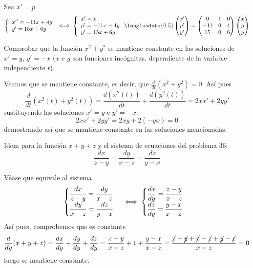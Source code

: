 \begin{sol}
Sea $x'=p$
    $$\left\{ \begin{array}{l}
         x'' = -11x + 4y  \\
         y' = 15x + 6y
    \end{array}\right. \iff \left\{ \begin{array}{l}
         x' = p \\
         p' = -11x+4y\\
         y' = 15x + 6y
    \end{array}\right. \longleadsto{0.5} \begin{pmatrix}
        x' \\ p' \\ y'
    \end{pmatrix}=\begin{pmatrix}
        0 & 1 & 0 \\
        -11 & 0 & 4 \\
        15 & 0 & 6
    \end{pmatrix} \begin{pmatrix}
        x \\ p \\ y 
    \end{pmatrix}$$
\end{sol}
\begin{ejer}
    Comprobar que la función $x^2+y^2$ se mantiene constante en las soluciones de $x'=y$, $y'=-x$ ($x$ e $y$ son funciones incógnitas, dependiente de la variable independiente $t$).
\end{ejer}
\begin{sol}
    Veamos que se mantiene constante, es decir, que $\frac{d}{dt}(x^2+y^2)=0$. Así pues
    $$\dfrac{d}{dt}(x^2(t)+y^2(t))=\dfrac{d(x^2(t))}{dt}+\dfrac{d(y^2(t))}{dt}=2xx'+2yy'$$
    sustituyendo las soluciones $x'=y$ e $y'=-x$:
    $$2xx'+2yy'=2xy+2(-yx)=0$$
    demostrando así que se mantiene constante en las soluciones mencionadas. 
\end{sol}
\begin{ejer}
     Idem para la función $x+y+z$ y el sistema de ecuaciones del problema 36:
     $$\dfrac{dx}{z-y}=\dfrac{dy}{x-z}=\dfrac{dz}{y-x}$$
\end{ejer}
\begin{sol} Véase que equivale al sistema 
    $$\begin{cases} \dfrac{dx}{z-y}=\dfrac{dy}{x-z} \\ \vspace{-5mm} \\ \dfrac{dy}{x-z}=\dfrac{dz}{y-x} \end{cases} \iff \begin{cases} \dfrac{dx}{dy}=\dfrac{z-y}{x-z} \\ \vspace{-5mm} \\ \dfrac{dz}{dy}=\dfrac{y-x}{x-z} \end{cases}$$
    Así pues, comprobemos que es constante
    $$\dfrac{d}{dy}(x+y+z)=\dfrac{dx}{dy}+\dfrac{dy}{dy}+\dfrac{dz}{dy}=\dfrac{z-y}{x-z}+1+\dfrac{y-x}{x-z}=\dfrac{\cancel{z}-\cancel{y}+\cancel{x}-\cancel{z}+\cancel{y}-\cancel{x}}{x-z}=0$$
    luego se mantiene constante.
\end{sol}
